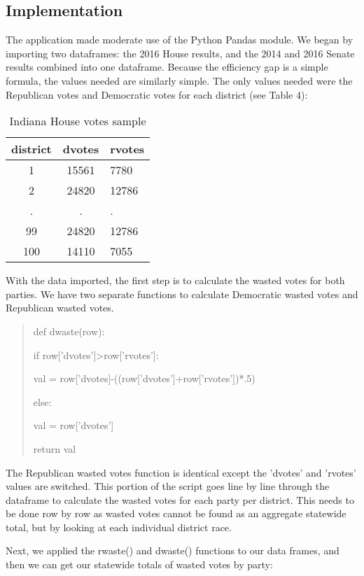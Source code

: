 \documentclass[sigconf]{acmart}
\begin{document}
\subsection{Implementation}

The application made moderate use of the Python Pandas module. We began by importing two dataframes: the 2016 House results, and the 2014 and 2016 Senate results combined into one dataframe. Because the efficiency gap is a simple formula, the values needed are similarly simple. The only values needed were the Republican votes and Democratic votes for each district (see Table 4):

\begin{table}
\caption{Indiana House votes sample \cite{houseresults}}
\label{tab:freq}
\begin{tabular}{ccl}
\hline
    district & dvotes & rvotes \\
    \hline
    1 & 15561 & 7780 \\
    \hline
    2 & 24820 & 12786 \\
    . & . & . \\
    99 & 24820 & 12786 \\
    \hline
    100 & 14110 & 7055 \\
    \hline
\end{tabular}
\end{table}

With the data imported, the first step is to calculate the wasted votes for both parties. We have two separate functions to calculate Democratic wasted votes and Republican wasted votes.
\begin{quote}
def dwaste(row):
    
    if row['dvotes']\textgreater row['rvotes']:
    
        val = row['dvotes]-((row['dvotes']+row['rvotes'])*.5)
    
    else:
    
        val = row['dvotes']
    
    return val
\end{quote}

The Republican wasted votes function is identical except the 'dvotes' and 'rvotes' values are switched. This portion of the script goes line by line through the dataframe to calculate the wasted votes for each party per district. This needs to be done row by row as wasted votes cannot be found as an aggregate statewide total, but by looking at each individual district race. 

Next, we applied the rwaste() and dwaste() functions to our data frames, and then we can get our statewide totals of wasted votes by party:
\end{document}
